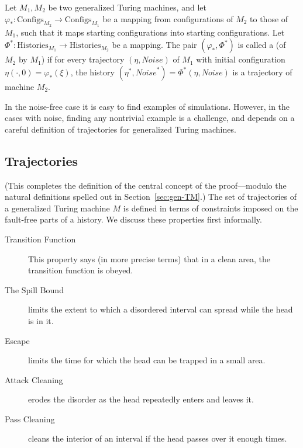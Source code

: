 \documentclass[11pt]{memoir}
\theoremstyle{definition} %
\newcommand{\Configs}{\mathrm{Configs}}
\newcommand{\Noise}{\mathit{Noise}}
\newcommand{\Histories}{\mathrm{Histories}}
\begin{document}
\begin{sloppypar}
\begin{definition}[Simulation] \label{def:simulation-central}
  Let \( M_{1},M_{2} \) be two generalized Turing machines, and let
  \( 
    \varphi_{*}:\Configs_{M_{2}} \to \Configs_{M_{1}} \)
be a mapping from configurations of \( M_{2} \) to those of \( M_{1} \), such that it maps
starting configurations into starting configurations.
Let \(    \Phi^{*}:\Histories_{M_{1}} \to \Histories_{M_{2}} \) be a mapping.
The pair \( (\varphi_{*}, \Phi^{*})  \)
is called a  (of \(  M_{2}  \) by \(  M_{1}  \)) if for every
trajectory \(  (\eta, \Noise)  \) of \( M_{1} \) with initial
configuration \(  \eta(\cdot,0)=\varphi_{*}(\xi)  \),
the history \(  (\eta^{*},\Noise^{*})=\Phi^{*}(\eta,\Noise)  \) is
a trajectory of machine \(  M_{2}  \).
\end{definition}
  \end{sloppypar}

In the noise-free case it is easy to find examples of simulations.
However, in the cases with noise, finding any nontrivial example 
is a challenge, and depends on a careful definition of trajectories for generalized Turing machines.

\subsection{Trajectories}\label{sec:traj}

(This completes the definition of the central concept of the
proof---modulo the natural definitions spelled out in Section~\ref{sec:gen-TM}.)
The set of trajectories of a generalized Turing machine \( M \)
is defined in terms of constraints imposed on the fault-free parts of a history.
We discuss these properties first informally.

\begin{description}
\item[Transition Function] This property says (in more precise terms)
that in a clean area, the transition function is obeyed.

\item[The Spill Bound] limits the extent to which a disordered interval can spread while
the head is in it.

\item[Escape] limits the time for which the head can be trapped in a small area.

\item[Attack Cleaning] erodes the disorder as the head repeatedly enters and leaves it.

\item[Pass Cleaning] cleans the interior of an
  interval if the head passes over it enough times.
  
\end{description}
\end{document}
